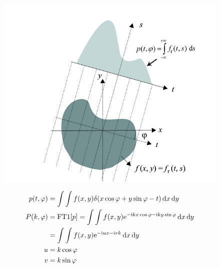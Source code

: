 \documentclass[slidestop,compress,12pt]{beamer}
\DeclareMathOperator{\diff}{d\!}
\newcommand{\im}{\mathrm{i}}
\newcommand{\ee}{\mathrm{e}}
\begin{document}
\section[Radon Transform]{}
\begin{frame}
    \begin{minipage}[c]{0.4\textwidth}
        \begin{figure}
        \includegraphics[scale=0.4, left]{imgs/radon1.png}
        \end{figure}
    \end{minipage}%
    \begin{minipage}{0.5\textwidth}
    \scriptsize
        \begin{equation}
            \begin{split}
                p(t, \varphi) &= \int\int f(x,y) \delta (x \cos{\varphi} + y \sin{\varphi} - t) \diff x \diff y \notag \\
                P(k, \varphi) &= \text{FT}1[p] = \int\int f(x,y) \ee ^ {-\im k x\cos{\varphi}  - \im k y\sin{\varphi} } \diff x \diff y \\
                & = \int\int f(x,y) \ee ^ {-\im ux  - \im vk} \diff x \diff y \\
                u &= k\cos{\varphi} \\
                v &= k\sin{\varphi}
            \end{split}
        \end{equation}
    \end{minipage}%


\end{frame}
\end{document}
